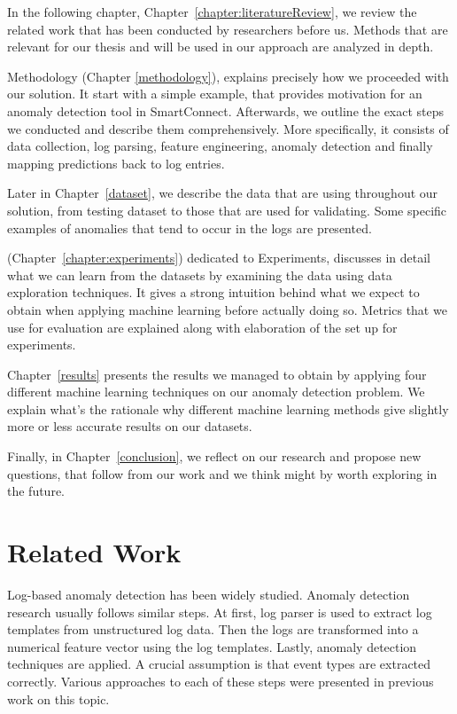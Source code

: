In the following chapter, Chapter~\ref{chapter:literatureReview}, we review the related work that has been conducted by researchers before us. Methods that are relevant for our thesis and will be used in our approach are analyzed in depth.

Methodology (Chapter \ref{methodology}), explains precisely how we proceeded with our solution. It start with a simple example, that provides motivation for an anomaly detection tool in SmartConnect. Afterwards, we outline the exact steps we conducted and describe them comprehensively. More specifically, it consists of data collection, log parsing, feature engineering, anomaly detection and finally mapping predictions back to log entries.

Later in Chapter~\ref{dataset}, we describe the data that are using throughout our solution, from testing dataset to those that are used for validating. Some specific examples of anomalies that tend to occur in the logs are presented.

(Chapter~\ref{chapter:experiments}) dedicated to Experiments, discusses in detail what we can learn from the datasets by examining the data using data exploration techniques.
It gives a strong intuition behind what we expect to obtain when applying machine learning before actually doing so. Metrics that we use for evaluation are explained along with elaboration of the set up for experiments.

Chapter~\ref{results} presents the results we managed to obtain by applying four different machine learning techniques on our anomaly detection problem. We explain what's the rationale why different machine learning methods give slightly more or less accurate results on our datasets.

Finally, in Chapter~\ref{conclusion}, we reflect on our research and propose new questions, that follow from our work and we think might by worth exploring in the future.

\section{Related Work}
Log-based anomaly detection has been widely studied. Anomaly detection research usually follows similar steps. At first, log parser is used to extract log templates from unstructured log data. Then the logs are transformed into a numerical feature vector using the log templates. Lastly, anomaly detection techniques are applied. A crucial assumption is that event types are extracted correctly. Various approaches to each of these steps were presented in previous work on this topic. 

